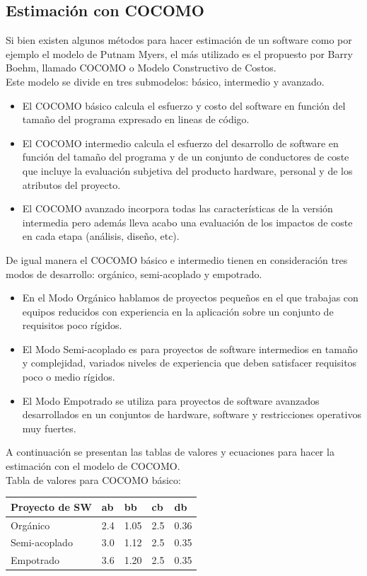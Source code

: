 \documentclass[10pt,executivepaper]{article}
\begin{document}
\subsection{Estimación con COCOMO}
Si bien existen algunos métodos para hacer estimación de un software como por ejemplo el modelo de Putnam Myers, el más utilizado es el propuesto por Barry Boehm, llamado COCOMO o Modelo Constructivo de Costos.\\
Este modelo se divide en tres submodelos: básico, intermedio y avanzado.
\begin{itemize}
    \item El COCOMO básico calcula el esfuerzo y costo del software en función del tamaño del programa expresado en lineas de código.
    \item El COCOMO intermedio calcula el esfuerzo del desarrollo de software en función del tamaño del programa y de un conjunto de conductores de coste que incluye la evaluación subjetiva del producto hardware, personal y de los atributos del proyecto.
    \item El COCOMO avanzado incorpora todas las características de la versión intermedia pero además lleva acabo una evaluación de los impactos de coste en cada etapa (análisis, diseño, etc).
\end{itemize}
De igual manera el COCOMO básico e intermedio tienen en consideración tres modos de desarrollo: orgánico, semi-acoplado y empotrado.
\begin{itemize}
    \item En el Modo Orgánico hablamos de proyectos pequeños en el que trabajas con equipos reducidos con experiencia en la aplicación sobre un conjunto de requisitos poco rígidos.
    \item El Modo Semi-acoplado es para proyectos de software intermedios en tamaño y complejidad, variados niveles de experiencia que deben satisfacer requisitos poco o medio rígidos.
    \item El Modo Empotrado se utiliza para proyectos de software avanzados desarrollados en un conjuntos de hardware, software y restricciones operativos muy fuertes.
\end{itemize}
A continuación se presentan las tablas de valores y ecuaciones para hacer la estimación con el modelo de COCOMO.\\
Tabla de valores para COCOMO básico:
\begin{center}
\begin{tabular}{|p{3cm}|p{1cm}|p{1cm}|p{1cm}|p{1cm}|}\hline
     Proyecto de SW & ab & bb & cb & db\\\hline
     Orgánico & 2.4 & 1.05 & 2.5 & 0.36 \\\hline
     Semi-acoplado & 3.0 & 1.12 & 2.5 & 0.35 \\\hline
     Empotrado & 3.6 & 1.20 & 2.5 & 0.35 \\\hline
\end{tabular}
\end{center}
\end{document}
